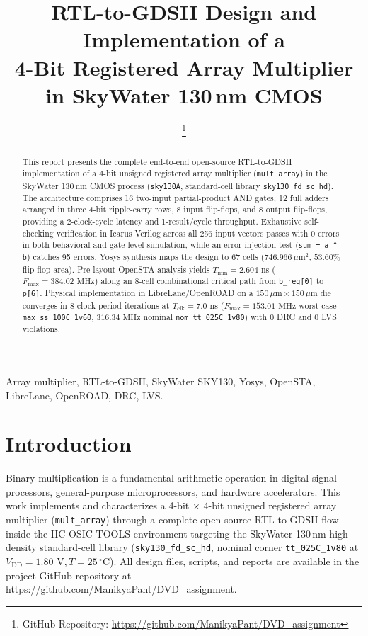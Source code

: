 \documentclass[conference,10pt]{IEEEtran}
\title{RTL-to-GDSII Design and Implementation of a\\4-Bit Registered Array Multiplier in SkyWater 130\,nm CMOS}
\author{
\IEEEauthorblockN{Manikya Pant}
\IEEEauthorblockA{\textit{Roll Number: 2023112024}\\
Digital VLSI Design, IIIT Hyderabad\\
manikya.pant@research.iiit.ac.in\\
\textbf{GitHub}: \url{https://github.com/ManikyaPant/DVD_assignment}}
\and
\IEEEauthorblockN{Aryan Agrawal}
\IEEEauthorblockA{\textit{Roll Number: 2023102050}\\
Digital VLSI Design, IIIT Hyderabad\\
aryan.agrawal@students.iiit.ac.in\\
\textbf{GitHub}: \url{https://github.com/ManikyaPant/DVD_assignment}}
\thanks{GitHub Repository: \url{https://github.com/ManikyaPant/DVD_assignment}}
}
\begin{document}
\maketitle

\begin{abstract}
This report presents the complete end-to-end open-source RTL-to-GDSII implementation of a 4-bit unsigned registered array multiplier (\texttt{mult\_array}) in the SkyWater 130\,nm CMOS process (\texttt{sky130A}, standard-cell library \texttt{sky130\_fd\_sc\_hd}). The architecture comprises 16 two-input partial-product AND gates, 12 full adders arranged in three 4-bit ripple-carry rows, 8 input flip-flops, and 8 output flip-flops, providing a 2-clock-cycle latency and 1-result/cycle throughput. Exhaustive self-checking verification in Icarus Verilog across all 256 input vectors passes with 0 errors in both behavioral and gate-level simulation, while an error-injection test (\texttt{sum = a \^{} b}) catches 95 errors. Yosys synthesis maps the design to 67 cells ($746.966\,\mu\text{m}^2$, $53.60\%$ flip-flop area). Pre-layout OpenSTA analysis yields $T_{\min} = 2.604\text{ ns}$ ($F_{\max} = 384.02\text{ MHz}$) along an 8-cell combinational critical path from \texttt{b\_reg[0]} to \texttt{p[6]}. Physical implementation in LibreLane/OpenROAD on a $150\,\mu\text{m} \times 150\,\mu\text{m}$ die converges in 8 clock-period iterations at $T_{\text{clk}} = 7.0\text{ ns}$ ($F_{\max} = 153.01\text{ MHz}$ worst-case \texttt{max\_ss\_100C\_1v60}, $316.34\text{ MHz}$ nominal \texttt{nom\_tt\_025C\_1v80}) with 0 DRC and 0 LVS violations.
\end{abstract}

\begin{IEEEkeywords}
Array multiplier, RTL-to-GDSII, SkyWater SKY130, Yosys, OpenSTA, LibreLane, OpenROAD, DRC, LVS.
\end{IEEEkeywords}

\section{Introduction}
Binary multiplication is a fundamental arithmetic operation in digital signal processors, general-purpose microprocessors, and hardware accelerators. This work implements and characterizes a 4-bit $\times$ 4-bit unsigned registered array multiplier (\texttt{mult\_array}) through a complete open-source RTL-to-GDSII flow inside the IIC-OSIC-TOOLS environment targeting the SkyWater 130\,nm high-density standard-cell library (\texttt{sky130\_fd\_sc\_hd}, nominal corner \texttt{tt\_025C\_1v80} at $V_{\text{DD}} = 1.80\text{ V}, T = 25\,^\circ\text{C}$). All design files, scripts, and reports are available in the project GitHub repository at \url{https://github.com/ManikyaPant/DVD_assignment}.
\end{document}
